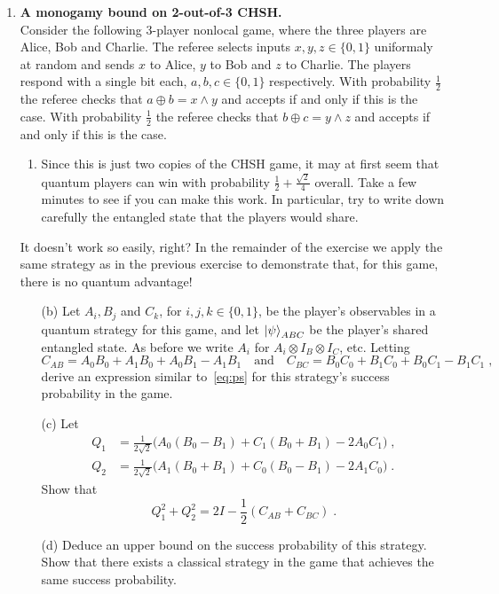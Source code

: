 \documentclass[12pt]{article}
\begin{document}
\begin{enumerate}
\item \textbf{A monogamy bound on 2-out-of-3 CHSH. }\\
Consider the following $3$-player nonlocal game, where the three players are Alice, Bob and Charlie. The referee selects inputs $x,y,z\in\{0,1\}$ uniformaly at random and sends $x$ to Alice, $y$ to Bob and $z$ to Charlie. The players respond with a single bit each, $a,b,c\in\{0,1\}$ respectively. With probability $\frac12$ the referee checks that $a\oplus b = x\wedge y$ and accepts if and only if this is the case. With probability $\frac12$ the referee checks that $b\oplus c = y\wedge z$ and accepts if and only if this is the case. 
\begin{enumerate}
\item Since this is just two copies of the CHSH game, it may at first seem that quantum players can win with probability $\frac12+\frac{\sqrt{2}}{4}$ overall. Take a few minutes to see if you can make this work. In particular, try to write down carefully the entangled state that the players would share. 
\end{enumerate}
It doesn't work so easily, right? In the remainder of the exercise we apply the same strategy as in the previous exercise to demonstrate that, for this game, there is no quantum advantage!
\begin{enumerate}
\item[(b)] Let $A_i, B_j$ and $C_k$, for $i,j,k\in\{0,1\}$, be the player's  observables in a quantum strategy for this game, and let $\ket{\psi}_{ABC}$ be the player's shared entangled state. As before we write $A_i$ for $A_i\otimes I_B\otimes I_C$, etc. Letting 
\[C_{AB} = A_0B_0 + A_1B_0 + A_0B_1-A_1B_1\quad\text{and}\quad C_{BC} = B_0C_0 + B_1C_0 + B_0C_1-B_1C_1\;,\]
derive an expression similar to~\eqref{eq:ps} for this strategy's success probability in the game. 
\item[(c)] Let 
\begin{align*}
Q_1 &= \frac{1}{2\sqrt{2}}\big( A_0(B_0-B_1)+C_1(B_0+B_1)-2A_0C_1\big)\;,\\
Q_2 &= \frac{1}{2\sqrt{2}}\big( A_1(B_0+B_1)+C_0(B_0-B_1)-2A_1C_0\big)\;.
\end{align*}
Show that
\[ Q_1^2+Q_2^2 = 2I-\frac{1}{2}(C_{AB}+C_{BC})\;.\]
\item[(d)] Deduce an upper bound on the success probability of this strategy. Show that there exists a classical strategy in the game that achieves the same success probability. 
\end{enumerate}
\end{enumerate}
\end{document}
